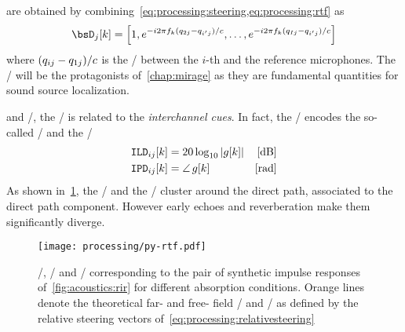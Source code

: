  are obtained by combining~\cref{eq:processing:steering,eq:processing:rtf} as
\begin{equation}\label{eq:processing:relativesteering}
    {\bsD}_{j}[k] = \klist{
                         1,
                         \cste^{-\csti 2 \pi f_k (\distMicSrc_{2j}-\distMicSrc_{i'j}) / \speedOfSound},
                         \ldots,
                         \cste^{-\csti 2 \pi f_k (\distMicSrc_{Ij}-\distMicSrc_{i'j}) / \speedOfSound}
                    }
\end{equation}
where $(q_{ij}-q_{1j}) / c$ is the \TDOA/ between the $i$-th and the reference microphones.
The \TDOAs/ will be the protagonists of~\cref{chap:mirage} as they are fundamental quantities for sound source localization.



 and \CASA/, the \ReTF/ is related to the \textit{interchannel cues}.
In fact, the \ReTFs/ encodes the so-called \ILD/ and the \IPD/
\begin{equation}
    \begin{aligned}
        \ild_{\idxMicSrc}[k] &= 20 \log_{10} \magnitudeOf{\rtf[k]} & [\si{\dB}]\\
        \ipd_{\idxMicSrc}[k] &= \phaseOf{\rtf[k]} \mathspace       & [\si{\radian}]
    \end{aligned}
\end{equation}
As shown in~\cref{fig:processing:ildipd}, the \ILD/ and the \IPD/ cluster around the direct path, associated to the direct path component.
However early echoes and reverberation make them significantly diverge.

\begin{figure}[b]
    \begin{fullwidth}
        \texttt{[image: processing/py-rtf.pdf]}
        \caption{
            \RIR/, \ILD/ and \IPD/ corresponding to the pair of synthetic impulse responses of~\cref{fig:acoustics:rir} for different absorption conditions.
            Orange lines denote the theoretical far- and free- field \ILD/ and \IPD/ as defined by the relative steering vectors of~\cref{eq:processing:relativesteering}
        }\label{fig:processing:ildipd}
    \end{fullwidth}
\end{figure}



